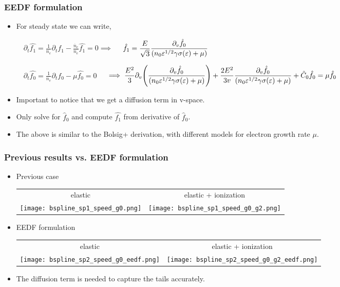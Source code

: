 \documentclass[mathserif, aspectratio=169]{beamer}
\newcommand{\of}[1]{\mleft( #1 \mright)}
\begin{document}
\begin{frame}
	\frametitle{EEDF formulation}
	\begin{itemize}
		\item For steady state we can write, 
		\begin{center}
			$
			\displaystyle
			\quad
			\partial_t \hat{f_1} = \frac{1}{n_e} \partial_t f_1 - \frac{\dot{n_e}}{n_e} \hat{f_1} =0 \implies $
			$
			\displaystyle
			\quad
			\hat{f_1} = \frac{E}{\sqrt{3}} \frac{\partial_{v}\hat{f_0}}{(n_0 \varepsilon^{1/2}\gamma \sigma\of{\varepsilon} + \mu)}$
		\end{center}
		\begin{center}
			$
			\displaystyle
			\quad
			\partial_t \hat{f_0} = \frac{1}{n_e} \partial_t f_0 - \mu \hat{f_0} = 0$ 
			$
			\displaystyle
			\quad
			\implies
			\frac{E^2}{3} \partial_{v} \of{\frac{\partial_v \hat f_0}{(n_0 \varepsilon^{1/2}\gamma \sigma\of{\varepsilon} + \mu)}} + \frac{2E^2}{3v} \frac{\partial_v \hat{f_0}}{(n_0 \varepsilon^{1/2}\gamma \sigma\of{\varepsilon} + \mu)} + \tilde C_0 \hat{f_0} = \mu \hat{f_0}$
		\end{center}
		\item Important to notice that we get a diffusion term in v-space. 
		\item Only solve for $\hat{f}_0$ and compute $\hat{f_1}$ from derivative of $\hat{f}_0$.
		\item The above is similar to the Bolsig+ derivation, with different models for electron growth rate $\mu$. 
	\end{itemize}
\end{frame}

\begin{frame}[fragile]
	\frametitle{Previous results vs. EEDF formulation}
	\centering

		\only<+>
		{
			\begin{itemize}
			\item Previous case \\
			\centering
			\begin{tabular}{cc}
			elastic & elastic + ionization \\
			\texttt{[image: bspline\_sp1\_speed\_g0.png]} & 
			\texttt{[image: bspline\_sp1\_speed\_g0\_g2.png]} 
			\end{tabular}
			\end{itemize}
		}
		\only<+>
		{
			\begin{itemize}
				\item EEDF formulation \\
				\centering
				\begin{tabular}{cc}
					elastic & elastic + ionization \\
					\texttt{[image: bspline\_sp2\_speed\_g0\_eedf.png]} & 
					\texttt{[image: bspline\_sp2\_speed\_g0\_g2\_eedf.png]} 
				\end{tabular}
			\end{itemize}
		}
		\begin{itemize}
			\item The diffusion term is needed to capture the tails accurately. 
		\end{itemize}
\end{frame}
\end{document}
